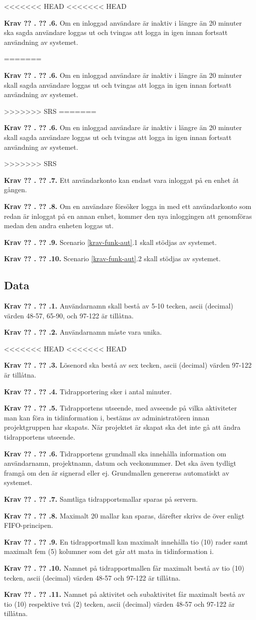 \documentclass[a4paper]{article}
\newcommand\getcurrentref[1]{%
 \ifnumequal{\value{#1}}{0}
  {??}
  {\the\value{#1}}%
}
\newcommand\requirement[2]{
	\numberedrow{Krav}{#1}{#2}
}
\newcommand\numberedrow[3]{
	\noindent
	\textbf{#1 \getcurrentref{section}.\getcurrentref{subsection}.#2.} #3
	
}
\begin{document}
<<<<<<< HEAD
<<<<<<< HEAD
\requirement{6}{Om en inloggad användare är inaktiv i längre än 20 minuter ska sagda användare loggas ut och tvingas att logga in igen innan fortsatt användning av systemet.}
=======
\requirement{6}{Om en inloggad användare är inaktiv i längre än 20 minuter skall sagda användare loggas ut och tvingas att logga in igen innan fortsatt användning av systemet.}
>>>>>>> SRS
=======
\requirement{6}{Om en inloggad användare är inaktiv i längre än 20 minuter skall sagda användare loggas ut och tvingas att logga in igen innan fortsatt användning av systemet.}
>>>>>>> SRS
\requirement{7}{Ett användarkonto kan endast vara inloggat på en enhet åt gången.}
\requirement{8}{Om en användare försöker logga in med ett användarkonto som redan är inloggat på en annan enhet, kommer den nya inloggingen att genomföras medan den andra enheten loggas ut.}
\requirement{9}{Scenario \ref{krav-funk-aut}.1 skall stödjas av systemet.}
\requirement{10}{Scenario \ref{krav-funk-aut}.2 skall stödjas av systemet.}
\subsection{Data}
\label{krav-funk-data}
\requirement{1}{Användarnamn skall bestå av 5-10 tecken, ascii (decimal) värden 48-57, 65-90, och 97-122 är tillåtna.}
\requirement{2}{Användarnamn måste vara unika.}
<<<<<<< HEAD
<<<<<<< HEAD
\requirement{3}{Lösenord ska bestå av sex tecken, ascii (decimal) värden 97-122 är tillåtna.}
\requirement{4}{Tidrapportering sker i antal minuter.}
\requirement{5}{Tidrapportens utseende, med avseende på vilka aktiviteter man kan föra in tidinformation i, bestäms av administratören innan projektgruppen har skapats. När projektet är skapat ska det inte gå att ändra tidrapportens utseende.}
\requirement{6}{Tidrapportens grundmall ska innehålla information om användarnamn, projektnamn, datum och veckonummer. Det ska även tydligt framgå om den är signerad eller ej. Grundmallen genereras automatiskt av systemet.}
\requirement{7}{Samtliga tidrapportsmallar sparas på servern.}
\requirement{8}{Maximalt 20 mallar kan sparas, därefter skrivs de över enligt FIFO-principen.}
\requirement{9}{En tidrapportmall kan maximalt innehålla tio (10) rader samt maximalt fem (5) kolumner som det går att mata in tidinformation i.}
\requirement{10}{Namnet på tidrapportmallen får maximalt bestå av tio (10) tecken, ascii (decimal) värden 48-57 och 97-122 är tillåtna.}
\requirement{11}{Namnet på aktivitet och subaktivitet får maximalt bestå av tio (10) respektive två (2) tecken, ascii (decimal) värden 48-57 och 97-122 är tillåtna.}
\end{document}
